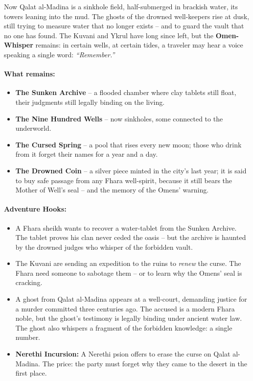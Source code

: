 Now Qalat al-Madina is a sinkhole field, half-submerged in brackish water, its towers leaning into the mud. The ghosts of the drowned well-keepers rise at dusk, still trying to measure water that no longer exists -- and to guard the vault that no one has found. The Kuvani and Ykrul have long since left, but the \textbf{Omen-Whisper} remains: in certain wells, at certain tides, a traveler may hear a voice speaking a single word: \textit{``Remember.''}

\paragraph{What remains:}
\begin{itemize}
  \item \textbf{The Sunken Archive} -- a flooded chamber where clay tablets still float, their judgments still legally binding on the living.
  \item \textbf{The Nine Hundred Wells} -- now sinkholes, some connected to the underworld.
  \item \textbf{The Cursed Spring} -- a pool that rises every new moon; those who drink from it forget their names for a year and a day.
  \item \textbf{The Drowned Coin} -- a silver piece minted in the city's last year; it is said to buy safe passage from any Fhara well-spirit, because it still bears the Mother of Well's seal -- and the memory of the Omens' warning.
\end{itemize}

\paragraph{Adventure Hooks:}
\begin{itemize}
  \item A Fhara sheikh wants to recover a water-tablet from the Sunken Archive. The tablet proves his clan never ceded the oasis -- but the archive is haunted by the drowned judges who whisper of the forbidden vault.
  \item The Kuvani are sending an expedition to the ruins to \textit{renew} the curse. The Fhara need someone to sabotage them -- or to learn why the Omens' seal is cracking.
  \item A ghost from Qalat al-Madina appears at a well-court, demanding justice for a murder committed three centuries ago. The accused is a modern Fhara noble, but the ghost's testimony is legally binding under ancient water law. The ghost also whispers a fragment of the forbidden knowledge: a single number.
  \item \textbf{Nerethi Incursion:} A Nerethi psion offers to erase the curse on Qalat al-Madina. The price: the party must forget why they came to the desert in the first place.
\end{itemize}

